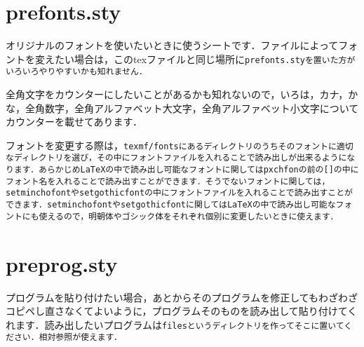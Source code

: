 \documentclass[a4paper, 9pt]{jsarticle}
\begin{document}
\section{prefonts.sty}
オリジナルのフォントを使いたいときに使うシートです．ファイルによってフォントを変えたい場合は，このtexファイルと同じ場所に\tt{prefonts.sty}を置いた方がいろいろやりやすいかも知れません．\par 
全角文字をカウンターにしたいことがあるかも知れないので，いろは，カナ，かな，全角数字，全角アルファベット大文字，全角アルファベット小文字についてカウンターを載せてあります．\par 
フォントを変更する際は，\tt{texmf/fonts}にあるディレクトリのうちそのフォントに適切なディレクトリを選び，その中にフォントファイルを入れることで読み出しが出来るようになります．あらかじめ\LaTeX の中で読み出し可能なフォントに関しては\tt{pxchfon}の前の[]の中にフォント名を入れることで読み出すことができます．そうでないフォントに関しては，\tt{setminchofont}や\tt{setgothicfont}の中にフォントファイルを入れることで読み出すことができます．\tt{setminchofont}や\tt{setgothicfont}に関しては\LaTeX の中で読み出し可能なフォントにも使えるので，明朝体やゴシック体をそれぞれ個別に変更したいときに使えます．

\section{preprog.sty}
プログラムを貼り付けたい場合，あとからそのプログラムを修正してもわざわざコピペし直さなくてよいように，プログラムそのものを読み出して貼り付けてくれます．読み出したいプログラムは\tt{files}というディレクトリを作ってそこに置いてください．相対参照が使えます．

\end{document}
